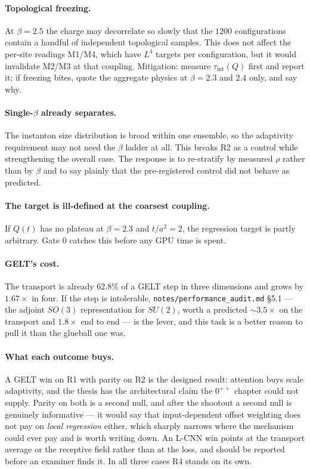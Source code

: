\documentclass[11pt,a4paper]{article}
\begin{document}
\paragraph{Topological freezing.} At $\beta = 2.5$ the charge may decorrelate so
slowly that the $1200$ configurations contain a handful of independent
topological samples. This does not affect the per-site readings M1/M4, which have
$L^4$ targets per configuration, but it would invalidate M2/M3 at that coupling.
Mitigation: measure $\tau_{\mathrm{int}}(Q)$ first and report it; if freezing
bites, quote the aggregate physics at $\beta = 2.3$ and $2.4$ only, and say why.

\paragraph{Single-$\beta$ already separates.} The instanton size distribution is
broad within one ensemble, so the adaptivity requirement may not need the
$\beta$ ladder at all. This breaks R2 as a control while strengthening the
overall case. The response is to re-stratify by measured $\rho$ rather than by
$\beta$ and to say plainly that the pre-registered control did not behave as
predicted.

\paragraph{The target is ill-defined at the coarsest coupling.} If $Q(t)$ has no
plateau at $\beta = 2.3$ and $t/a^2 = 2$, the regression target is partly
arbitrary. Gate 0 catches this before any GPU time is spent.

\paragraph{GELT's cost.} The transport is already $62.8\%$ of a GELT step in
three dimensions and grows by $1.67\times$ in four. If the step is intolerable,
\texttt{notes/performance\_audit.md} \S5.1 --- the adjoint $SO(3)$ representation
for $SU(2)$, worth a predicted $\sim 3.5\times$ on the transport and $1.8\times$
end to end --- is the lever, and this task is a better reason to pull it than the
glueball one was.

\paragraph{What each outcome buys.} A GELT win on R1 with parity on R2 is the
designed result: attention buys scale adaptivity, and the thesis has the
architectural claim the $0^{++}$ chapter could not supply. Parity on both is a
second null, and after the shootout a second null is genuinely informative --- it
would say that input-dependent offset weighting does not pay on \emph{local
regression} either, which sharply narrows where the mechanism could ever pay and
is worth writing down. An L-CNN win points at the transport average or the
receptive field rather than at the loss, and should be reported before an
examiner finds it. In all three cases R4 stands on its own.
\end{document}
